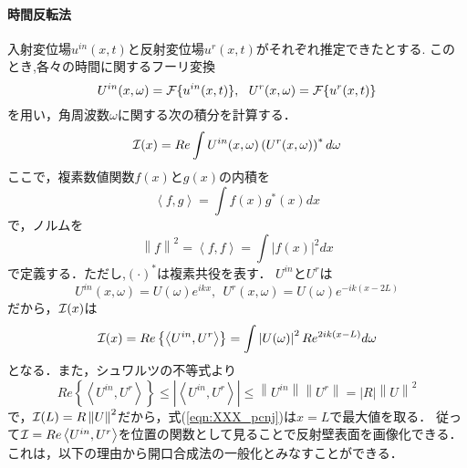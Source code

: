 \paragraph{時間反転法}
入射変位場$u^{in}(x,t)$と反射変位場$u^{r}(x,t)$がそれぞれ推定できたとする.
このとき,各々の時間に関するフーリ変換
\begin{equation}
	U^{in}(x,\omega)={\cal F} \{ u^{in}(x,t)\}, \ \ 
	U^{r}(x,\omega)={\cal F} \{ u^{r}(x,t)\}
	\label{eqn:XXX_19}
\end{equation}
を用い，角周波数$\omega$に関する次の積分を計算する．
\begin{equation}
	{\cal I }(x)=
	Re 
	\int 	
	U^{in}(x,\omega)\left( U^{r}(x,\omega)\right)^* d\omega
	\label{eqn:XXX_20}
\end{equation}
ここで，複素数値関数$f(x)$と$g(x)$の内積を
\begin{equation}
	\left< f,g\right>=\int f(x)g^*(x)dx
	\label{eqn:XXX_21}
\end{equation}
で，ノルムを
\begin{equation}
	\left\| f \right\|^2=\left<f,f\right> =\int |f(x)|^2dx
	\label{eqn:XXX_21}
\end{equation}
で定義する．ただし,$(\cdot)^*$は複素共役を表す．
$U^{in}$と$U^{r}$は
\begin{equation}
	U^{in}(x,\omega)=U(\omega)e^{ikx}, \ \ 
	U^{r}(x,\omega)=U(\omega)e^{-ik(x-2L)}
	\label{eqn:XXX_22}
\end{equation}
だから，${\cal I}(x)$は
\begin{equation}
	{\cal I}(x)
	=
	Re \left\{ 
	\left< U^{in},U^{r}\right>
	\right\}
	=
	\int 
	\left| U(\omega) \right|^2 
	R
	e^{2ik(x-L)}d\omega
	\label{eqn:XXX_pcnj}
\end{equation}
となる．また，シュワルツの不等式より
\begin{equation}
	Re \left\{ \left< U^{in}, U^{r}\right> \right\}
	\leq 
	\left| \left< U^{in},U^{r} \right> \right|
	\leq  \left\| U^{in}\right\| \left\| U^{r}\right\|
	=\left| R \right|
	\left\| U\right\|^2
	\label{eqn:XXX_23}
\end{equation}
で，${\cal I}(L)=R \left\| U\right\|^2$だから，式(\ref{eqn:XXX_pcnj})は$x=L$で最大値を取る．
従って${\cal I}=Re \left<U^{in},U^{r}\right>$を位置の関数として見ることで反射壁表面を画像化できる．
これは，以下の理由から開口合成法の一般化とみなすことができる．

